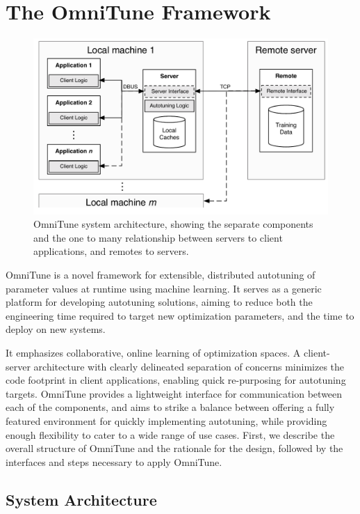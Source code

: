 \documentclass[nonatbib,preprint,nocopyrightspace,9pt]{sigplanconf}
\begin{document}
\section{The OmniTune Framework}\label{sec:autotune}

\begin{figure}
\centering
\includegraphics[width=.98\columnwidth]{img/omnitune-system-overview.pdf}
\caption{%
  OmniTune system architecture, showing the separate components and the one to
  many relationship between servers to client applications, and remotes to
  servers.
  \vspace{-1em}%
}
\label{fig:omnitune-system-overview}
\end{figure}

OmniTune is a novel framework for extensible, distributed autotuning of
parameter values at runtime using machine learning. It serves as a generic
platform for developing autotuning solutions, aiming to reduce both the
engineering time required to target new optimization parameters, and the time to
deploy on new systems.

It emphasizes collaborative, online learning of optimization spaces. A client-
server architecture with clearly delineated separation of concerns minimizes the
code footprint in client applications, enabling quick re-purposing for
autotuning targets. OmniTune provides a lightweight interface for communication
between each of the components, and aims to strike a balance between offering a
fully featured environment for quickly implementing autotuning, while providing
enough flexibility to cater to a wide range of use cases. First, we describe the
overall structure of OmniTune and the rationale for the design, followed by the
interfaces and steps necessary to apply OmniTune.


\subsection{System Architecture}
\end{document}
